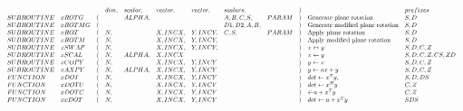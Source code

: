 \begin{figure}[h]
    \centering
    \[
        \scalemath{0.55}{
            \begin{array}{llllllllllllllllll}
                &        &   &dim, &scalar, &  vector, &  vector, &            scalars, &       & ) &  & prefixes\\
                SUBROUTINE & xROTG  & ( &     & ALPHA, &          &          &         A, B, C, S, & PARAM & ) & \text{Generate plane rotation} & S, D\\
                SUBROUTINE & xROTMG & ( &     &        &          &          & D1, D2, A, B,       &       & ) & \text{Generate modified plane rotation} & S, D\\
                SUBROUTINE & xROT   & ( &  N, &        & X, INCX, & Y, INCY, &               C, S, & PARAM & ) & \text{Apply plane rotation} & S, D\\
                SUBROUTINE & xROTM  & ( &  N, &        & X, INCX, & Y, INCY, &                     &       & ) & \text{Apply modified plane rotation} & S, D\\
                SUBROUTINE & xSWAP  & ( &  N, &        & X, INCX, & Y, INCY, &                     &       & ) & x \leftrightarrow y & S, D, C, Z\\
                SUBROUTINE & xSCAL  & ( &  N, & ALPHA, & X, INCX  &          &                     &       & ) & x \leftarrow y & S, D, C, Z, CS, ZD\\
                SUBROUTINE & xCOPY  & ( &  N, &        & X, INCX, & Y, INCY  &                     &       & ) & y \leftarrow x & S, D, C, Z\\
                SUBROUTINE & xAXPY  & ( &  N, & ALPHA, & X, INCX, & Y, INCY  &                     &       & ) & y \leftarrow ax + y & S, D, C, Z\\
                FUNCTION   & xDOT   & ( &  N, &        & X, INCX, & Y, INCY  &                     &       & ) & dot \leftarrow x^Ty, & S, D, DS\\
                FUNCTION   & xDOTU  & ( &  N, &        & X, INCX, & Y, INCY  &                     &       & ) & dot \leftarrow x^Hy & C, Z\\
                FUNCTION   & xDOTC  & ( &  N, &        & X, INCX, & Y, INCY  &                     &       & ) & \dot \leftarrow a + x^Ty & C, Z\\
                FUNCTION   & xxDOT  & ( &  N, &        & X, INCX, & Y, INCY  &                     &       & ) &  dot \leftarrow a + x^Ty & SDS\\

\end{array}}\]
\end{figure}
